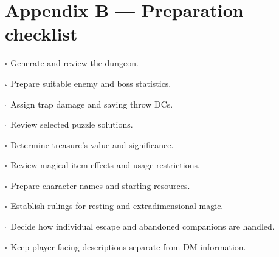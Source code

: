 \section{Appendix B — Preparation checklist}

\ensuremath{\square} Generate and review the dungeon.

\ensuremath{\square} Prepare suitable enemy and boss statistics.

\ensuremath{\square} Assign trap damage and saving throw DCs.

\ensuremath{\square} Review selected puzzle solutions.

\ensuremath{\square} Determine treasure's value and significance.

\ensuremath{\square} Review magical item effects and usage restrictions.

\ensuremath{\square} Prepare character names and starting resources.

\ensuremath{\square} Establish rulings for resting and extradimensional magic.

\ensuremath{\square} Decide how individual escape and abandoned companions are handled.

\ensuremath{\square} Keep player-facing descriptions separate from DM information.

